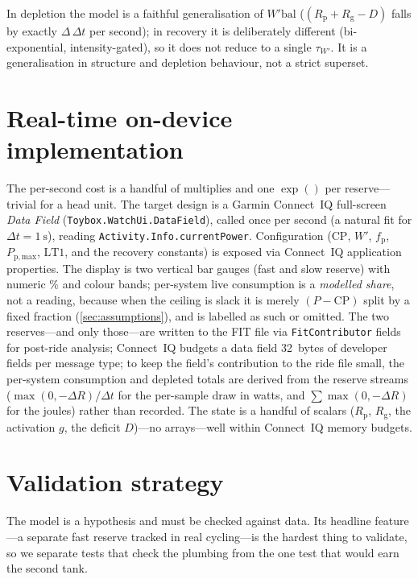 \documentclass[11pt,a4paper]{article}
\newcommand{\Wp}{\ensuremath{W'}}
\newcommand{\Wbal}{\ensuremath{W'\!\text{bal}}}
\newcommand{\CP}{\ensuremath{\mathrm{CP}}}
\newcommand{\LTone}{\ensuremath{\mathrm{LT1}}}
\newcommand{\fp}{\ensuremath{f_{\mathrm p}}}
\newcommand{\Rp}{\ensuremath{R_{\mathrm p}}}
\newcommand{\Rg}{\ensuremath{R_{\mathrm g}}}
\newcommand{\Ppmax}{\ensuremath{P_{\mathrm{p,max}}}}
\newcommand{\tauW}{\ensuremath{\tau_{W'}}}
\begin{document}
In depletion the model is a faithful generalisation of \Wbal{} ($(\Rp+\Rg-D)$ falls by exactly
$\Delta\,\Delta t$ per second); in recovery it is deliberately different (bi-exponential, intensity-gated),
so it does not reduce to a single \tauW. It is a generalisation in structure and depletion behaviour, not a
strict superset.

\section{Real-time on-device implementation}\label{sec:impl}

The per-second cost is a handful of multiplies and one $\exp()$ per reserve---trivial for a head unit. The
target design is a Garmin Connect~IQ full-screen \emph{Data Field} (\texttt{Toybox.WatchUi.DataField}),
called once per second (a natural fit for $\Delta t = 1~\mathrm{s}$), reading
\texttt{Activity.Info.currentPower}. Configuration (\CP, \Wp, \fp, \Ppmax, \LTone, and the recovery
constants) is exposed via Connect~IQ application properties. The display is two vertical bar gauges
(fast and slow reserve) with numeric \% and colour bands; per-system live consumption is a
\emph{modelled share}, not a reading, because when the ceiling is slack it is merely $(P - \CP)$ split by a
fixed fraction (\cref{sec:assumptions}), and is labelled as such or omitted. The two reserves---and only
those---are written to the FIT file via \texttt{FitContributor} fields for post-ride analysis; Connect~IQ
budgets a data field 32~bytes of developer fields per message type; to keep the field's contribution
to the ride file small, the per-system consumption and depleted totals are derived from the reserve streams ($\max(0, -\Delta R)/\Delta t$ for the
per-sample draw in watts, and $\sum \max(0, -\Delta R)$ for the joules) rather than recorded. The state is a
handful of scalars ($\Rp$, $\Rg$, the activation $g$, the deficit $D$)---no arrays---well within Connect~IQ
memory budgets.

\section{Validation strategy}\label{sec:validation}

The model is a hypothesis and must be checked against data. Its headline feature---a separate fast reserve
tracked in real cycling---is the hardest thing to validate, so we separate tests that check the plumbing
from the one test that would earn the second tank.
\end{document}
